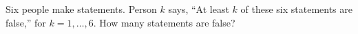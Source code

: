 Six people make statements. Person $k$ says, ``At least $k$ of these six statements are false,'' for $k=1,\ldots,6$. How many statements are false?
